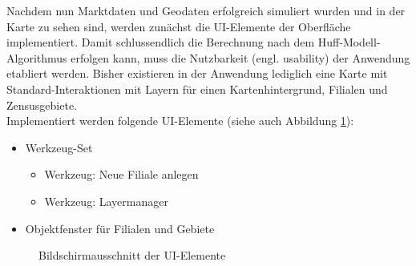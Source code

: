 Nachdem nun Marktdaten und Geodaten erfolgreich simuliert wurden und in der Karte zu sehen sind, werden zunächst die UI-Elemente der Oberfläche implementiert.
Damit schlussendlich die Berechnung nach dem Huff-Modell-Algorithmus erfolgen kann, muss die Nutzbarkeit (engl. usability) der Anwendung etabliert werden.
Bisher existieren in der Anwendung lediglich eine Karte mit Standard-Interaktionen mit Layern für einen Kartenhintergrund, Filialen und Zensusgebiete.\\
Implementiert werden folgende UI-Elemente (siehe auch Abbildung \ref{img:toolset}):

\begin{itemize}
	\item Werkzeug-Set
	\begin{itemize}
		\item Werkzeug: Neue Filiale anlegen
		\item Werkzeug: Layermanager
	\end{itemize}
	\item Objektfenster für Filialen und Gebiete
\end{itemize}

\begin{figure}[H]
	\caption{Bildschirmausschnitt der UI-Elemente}
	\label{img:toolset}
\end{figure}

